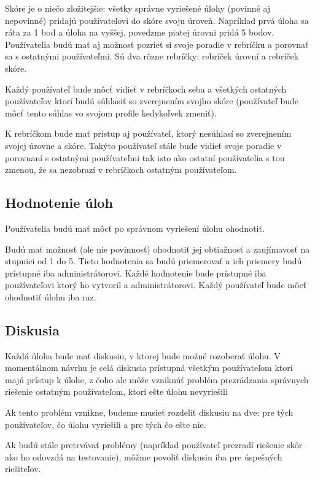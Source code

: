 Skóre je o niečo zložitejšie: všetky správne vyriešené úlohy (povinné aj nepovinné)
pridajú používateľovi do skóre svoju úroveň. Napríklad prvá úloha sa ráta za
1 bod a úloha na vyššej, povedzme piatej úrovni pridá 5 bodov.
\newline
\newline
Používatelia budú mať aj možnosť pozrieť si svoje poradie v rebríčku a porovnať sa
s ostatnými používateľmi. Sú dva rôzne rebríčky: rebríček úrovní a rebríček skóre.

Každý používateľ bude môcť vidieť v rebríčkoch seba a všetkých ostatných používateľov ktorí
budú súhlasiť so zverejnením svojho skóre (používateľ bude môcť tento súhlas vo svojom profile kedykoľvek zmeniť).

K rebríčkom bude mať prístup aj používateľ, ktorý nesúhlasí so zverejnením svojej úrovne a skóre.
Takýto používateľ stále bude vidieť svoje poradie v porovnaní s ostatnými používateľmi tak isto
ako ostatní používatelia s tou zmenou, že sa nezobrazí v rebríčkoch ostatným používateľom.

\subsection{Hodnotenie úloh}
\label{rating}
Používatelia budú mať môcť po správnom vyriešení úlohu ohodnotiť.

Budú mať možnosť (ale nie povinnosť) ohodnotiť jej obtiažnosť a
zaujímavosť na stupnici od 1 do 5. Tieto hodnotenia sa budú priemerovať a ich priemery
budú prístupné iba administrátorovi. Každé hodnotenie bude prístupné iba používateľovi ktorý
ho vytvoril a administrátorovi. Každý používateľ bude môcť ohodnotiť úlohu iba raz.

\subsection{Diskusia}
Každá úloha bude mať diskusiu, v ktorej bude možné rozoberať úlohu.
V momentálnom návrhu je celá diskusia prístupná všetkým používateľom ktorí majú
prístup k úlohe, z čoho ale môže vzniknúť problém prezrádzania správnych riešenie
ostatným používateľom, ktorí ešte úlohu nevyriešili

Ak tento problém vznikne, budeme musieť rozdeliť diskusiu na dve: pre tých používateľov, čo úlohu vyriešili a pre tých čo ešte nie.

Ak budú stále pretrvávať problémy (napríklad používateľ prezradí riešenie skôr ako ho odovzdá na testovanie),
môžme povoliť diskusiu iba pre úspešných riešiteľov.

